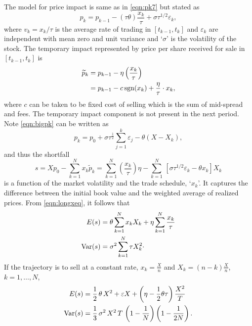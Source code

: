 The model for price impact is same as in \eqref{eqn:pk7} but stated as
	\begin{equation} \label{eqn:bigpk}
	p_k= p_{k-1} - (\tau\theta)\dfrac{x_k}{\tau} + \sigma \tau^{1/2}\varepsilon_k,
	\end{equation}
where $v_k = x_k / \tau$ is the average rate of trading in $[t_{k-1}, t_k]$ and $\varepsilon_k$ are independent with mean zero and unit variance and `$\sigma$' is the volatility of the stock. The temporary impact represented by price per share received for sale in $[t_{k-1}, t_k]$ is
	\begin{equation} \label{eqn:pdouble}
	\begin{split}
	\widetilde{p}_k &= p_{k-1} - \eta\left( \dfrac{x_k}{\tau} \right) \\
			&= p_{k-1} - c \sgn(x_k) + \frac{\eta}{\tau} \cdot x_k,
	\end{split}
	\end{equation}
where $c$ can be taken to be fixed cost of selling which is the sum of mid-spread and fees. The temporary impact component is not present in the next period. Note \eqref{eqn:bigpk} can be written as
	\begin{equation} \label{eqn:morepk}
	p_k = p_0 + \sigma\tau^{\frac{1}{2}}\sum_{j=1}^k\varepsilon_j - \theta(X - X_k),
	\end{equation}
and thus the shortfall
	\begin{equation} \label{eqn:longxeq}
	s = Xp_0 - \sum_{k=1}^N x_k\widetilde{p}_k = \sum_{k=1}^N \left(\frac{x_k}{\tau}\right) \eta - \sum_{k=1}^N \,[\sigma\tau^{1/2}\varepsilon_k - \theta x_k]X_k
	\end{equation}
is a function of the market volatility and the trade schedule, `$x_k$'. It captures the difference between the initial book value and the weighted average of realized prices. From \eqref{eqn:longxeq}, it follows that
	\begin{equation} \label{eqn:evardouble}
	\begin{split}
	E(s) &=  \theta\sum_{k=1}^N x_k X_k + \eta \sum_{k=1}^N \frac{x_k}{\tau} \\
	\var(s) &= \sigma^2 \sum_{k=1}^N \tau X_{k}^2\cdot
	\end{split}
	\end{equation}
If the trajectory is to sell at a constant rate, $x_k = \frac{X}{n}$ and $X_k = (n - k) \frac{X}{n}$, $k = 1, \ldots, N$,
	\begin{equation} \label{eqn:secondevardouble}
	\begin{split}
	E(s)&= \frac{1}{2}\, \theta\, X^2 + \varepsilon X + \left(\eta - \frac{1}{2} \theta \tau \right) \frac{X^2}{T} \\
	\var(s)&= \frac{1}{3}\, \sigma^2\, X^2\, T\, \left(1 - \frac{1}{N}\right)\left( 1 - \frac{1}{2N} \right).
	\end{split}
	\end{equation}
